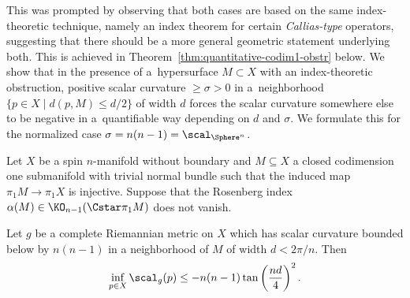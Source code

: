 This was prompted by observing that both cases are based on the same index-theoretic technique, namely an index theorem for certain \emph{Callias-type} operators, suggesting that there should be a more general geometric statement underlying both.
This is achieved in Theorem~\ref{thm:quantitative-codim1-obstr} below.
We show that in the presence of a~hypersurface \(M \subset X\) with an index-theoretic obstruction, positive scalar curvature \(\geq \sigma > 0\) in a~neighborhood \(\{p \in X \mid d(p, M) \leq d/2 \}\) of width \(d\) forces the scalar curvature somewhere else to be negative in a~quantifiable way depending on \(d\) and \(\sigma\).
We formulate this for the normalized case \(\sigma = n(n-1) = \scal_{\Sphere^n}\).

\begin{Theorem} \label{thm:quantitative-codim1-obstr}
 Let \(X\) be a spin \(n\)-manifold without boundary and \(M \subseteq X\) a closed codimension one submanifold with trivial normal bundle such that the induced map \(\pi_1 M \to \pi_1 X\) is injective.
 Suppose that the Rosenberg index \(\alpha(M) \in \KO_{n-1}(\Cstar \pi_1 M)\) does not vanish.

 Let \(g\) be a complete Riemannian metric on \(X\) which has scalar curvature bounded below by \(n(n-1)\) in a neighborhood of \(M\) of width \(d < 2\pi/n\).
 Then
 \begin{equation} \label{eq:negativity}
 \inf_{p \in X} \scal_g(p) \leq - n(n-1) \tan\left(\frac{nd}{4}\right)^2.
 \end{equation}
\end{Theorem}
